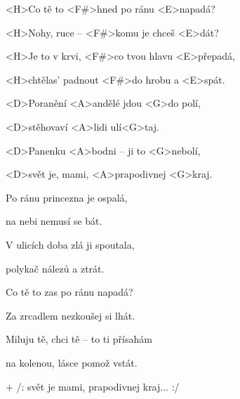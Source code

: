 

\zs
<H>Co tě to <F#>hned po ránu <E>napadá?

<H>Nohy, ruce -- <F#>komu je chceš <E>dát?

<H>Je to v krvi, <F#>co tvou hlavu <E>přepadá,

<H>chtělas' padnout <F#>do hrobu a <E>spát.
\ks

\zr
<D>Poranění <A>andělé jdou <G>do polí,

<D>stěhovaví <A>lidi ulí<G>taj.

<D>Panenku <A>bodni -- ji to <G>nebolí,

<D>svět je, mami, <A>prapodivnej <G>kraj.
\kr

\zs
Po ránu princezna je ospalá,

na nebi nemusí se bát.

V ulicích doba zlá ji spoutala,

polykač nálezů a ztrát.
\ks

\zr\kr

\zs
Co tě to zas po ránu napadá?

Za zrcadlem nezkoušej si lhát.

Miluju tě, chci tě -- to ti přísahám

na kolenou, lásce pomož vstát.
\ks

\zr\kr

+ /: svět je mami, prapodivnej kraj... :/

\kp
